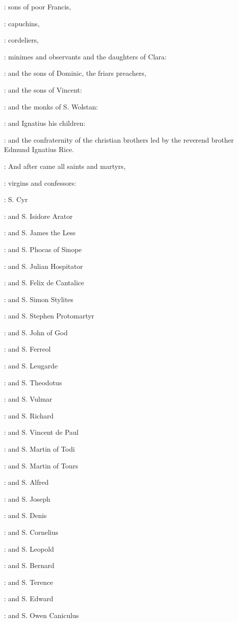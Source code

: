 :
sons of poor Francis,

:
capuchins,

:
cordeliers,

:
minimes and observants and the daughters of Clara:

:
and the sons of Dominic, the friars preachers,

:
and the sons of Vincent:

:
and the monks of S. Wolstan:

:
and Ignatius his children:

:
and the confraternity of the christian brothers
led by the reverend brother Edmund Ignatius Rice.

:
And after came all saints and martyrs,

:
virgins and confessors:

:
S. Cyr

:
and S. Isidore Arator

:
and S. James the Less 

:
and S. Phocas of Sinope 

:
and S. Julian Hospitator 

:
and S. Felix de Cantalice 

:
and S. Simon Stylites 

:
and S. Stephen Protomartyr 

:
and S. John of God 

:
and S. Ferreol 

:
and S. Leugarde 

:
and S. Theodotus 

:
and S. Vulmar 

:
and S. Richard 

:
and S. Vincent de Paul 

:
and S. Martin of Todi 

:
and S. Martin of Tours 

:
and S. Alfred 

:
and S. Joseph 

:
and S. Denis 

:
and S. Cornelius 

:
and S. Leopold 

:
and S. Bernard 

:
and S. Terence 

:
and S. Edward 

:
and S. Owen Caniculus 

